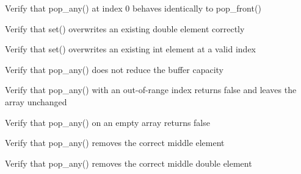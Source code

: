 \begin{DoxyRefList}
%
Verify that pop\+\_\+any() at index 0 behaves identically to pop\+\_\+front()  
\item[Global \doxylink{test__array_8cpp_a859932f54ed2be5974978f81fd9124f2}{TEST\+\_\+F} (\doxylink{classArrayInitTest}{Array\+Init\+Test}, Set\+Double\+Overwrites\+Existing\+Element)]\label{test__test000056}%
%
Verify that set() overwrites an existing double element correctly  
\item[Global \doxylink{test__array_8cpp_a46bbe57cf510e4b1ebbb2bef8531ba3e}{TEST\+\_\+F} (\doxylink{classArrayInitTest}{Array\+Init\+Test}, Set\+Int\+Overwrites\+Existing\+Element)]\label{test__test000055}%
%
Verify that set() overwrites an existing int element at a valid index  
\item[Global \doxylink{test__array_8cpp_a9baac735588574aee8a2b613829fdd5f}{TEST\+\_\+F} (\doxylink{classArrayInitTest}{Array\+Init\+Test}, Pop\+Any\+Does\+Not\+Reduce\+Capacity)]\label{test__test000054}%
%
Verify that pop\+\_\+any() does not reduce the buffer capacity  
\item[Global \doxylink{test__array_8cpp_a8ce87fbd17a4dd6b5b3b8a385a51d5f7}{TEST\+\_\+F} (\doxylink{classArrayInitTest}{Array\+Init\+Test}, Pop\+Any\+Out\+Of\+Range\+Returns\+False)]\label{test__test000053}%
%
Verify that pop\+\_\+any() with an out-\/of-\/range index returns false and leaves the array unchanged  
\item[Global \doxylink{test__array_8cpp_a8f2d62144814546583c872e14f672312}{TEST\+\_\+F} (\doxylink{classArrayInitTest}{Array\+Init\+Test}, Pop\+Any\+On\+Empty\+Array\+Returns\+False)]\label{test__test000052}%
%
Verify that pop\+\_\+any() on an empty array returns false  
\item[Global \doxylink{test__array_8cpp_a42d08a343c2851438d082e9e4eba8b51}{TEST\+\_\+F} (\doxylink{classArrayInitTest}{Array\+Init\+Test}, Pop\+Any\+Point\+Middle\+Removal)]\label{test__test000051}%
%
Verify that pop\+\_\+any() removes the correct middle  element  
\item[Global \doxylink{test__array_8cpp_a949e796ce71c5c850ebca7af4932fcaf}{TEST\+\_\+F} (\doxylink{classArrayInitTest}{Array\+Init\+Test}, Pop\+Any\+Double\+Middle\+Removal)]\label{test__test000050}%
%
Verify that pop\+\_\+any() removes the correct middle double element  
\item[Global \doxylink{test__array_8cpp_aa8e88e2b7e0a2bcca86df9c1d20ea9ee}{TEST\+\_\+F} (\doxylink{classArrayInitTest}{Array\+Init\+Test}, Pop\+Any\+Int\+Middle\+Removal)]\label{test__test000049}%

\end{DoxyRefList}
